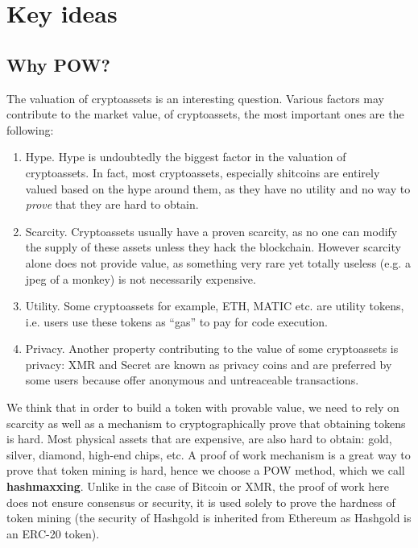 \documentclass[12pt, a4paper]{article}
\begin{document}
\newpage
\section{Key ideas}
\subsection{Why POW?}
\par The valuation of cryptoassets is an interesting question. Various factors may contribute to the market value, of cryptoassets, the most important ones are the following:
\begin{enumerate}
    \item Hype. Hype is undoubtedly the biggest factor in the valuation of cryptoassets. In fact, most cryptoassets, especially shitcoins are entirely valued based on the hype around them, as they have no utility and no way to \textit{prove} that they are hard to obtain.
    \item Scarcity. Cryptoassets usually have a proven scarcity, as no one can modify the supply of these assets unless they hack the blockchain. However scarcity alone does not provide value, as something very rare yet totally useless (e.g. a jpeg of a monkey) is not necessarily expensive.
    \item Utility. Some cryptoassets for example, ETH, MATIC etc. are utility tokens, i.e. users use these tokens as ``gas'' to pay for code execution.
    \item Privacy. Another property contributing to the value of some cryptoassets is privacy: XMR and Secret are known as privacy coins and are preferred by some users because offer anonymous and untreaceable transactions.
\end{enumerate}

We think that in order to build a token with provable value, we need to rely on scarcity as well as a mechanism to cryptographically prove that obtaining tokens is hard. Most physical assets that are expensive, are also hard to obtain: gold, silver, diamond, high-end chips, etc. A proof of work mechanism is a great way to prove that token mining is hard, hence we choose a POW method, which we call \textbf{hashmaxxing}.  
Unlike in the case of Bitcoin or XMR, the proof of work here does not ensure consensus or security, it is used solely to prove the hardness of token mining (the security of Hashgold is inherited from Ethereum as Hashgold is an ERC-20 token).
\end{document}
